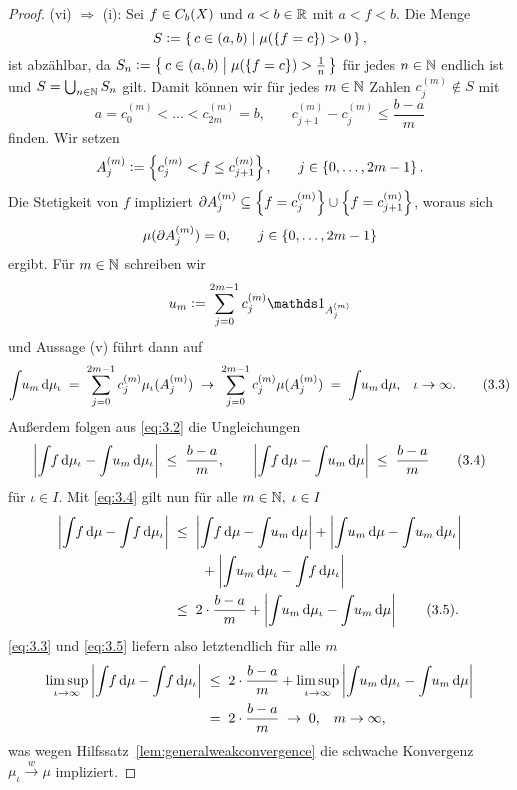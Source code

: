 \documentclass[../main/main.tex]{subfiles}
\begin{document}
\begin{proof}
		(vi) $\Rightarrow$ (i): Sei $f \in C_b(X)$ und $a < b \in \mathbb{R}$ 
		mit $a < f < b$. Die Menge
		$$S \vcentcolon = \left\{\, c \in (a, b) \; \middle| \; \mu(\left\{f = c\right\}) > 0 \,\right\} \text{,}$$
		ist abzählbar, da 
		$S_n \vcentcolon = \left\{\, c \in (a, b) \; \middle| \; \mu(\left\{f = c\right\}) > \frac{1}{n} \,\right\}$ 
		für jedes $n \in \mathbb{N}$ endlich ist und $S = \bigcup_{n \in \mathbb{N}} S_n$ gilt.
		Damit können wir für jedes $m \in \mathbb{N}$ Zahlen $c_j^{(m)} \notin S$ mit
		\[a = c_0^{(m)} < \dots < c_{2m}^{(m)} = 
		b \text{,} \qquad c_{j+1}^{(m)} - c_j^{(m)} \leq \frac{b-a}{m} 
		\label{eq:3.2} \tag{3.2}\]
		finden. Wir setzen
		$$A_j^{(m)} \vcentcolon = \left\{c_j^{(m)} < f \leq c_{j+1}^{(m)}\right\}\text{,}
		\qquad j \in \left\{0,\dots,2m-1\right\} \text{.}$$ 
		Die Stetigkeit von $f$ impliziert 
		$\partial A_j^{(m)} \subseteq \left\{f = c_j^{(m)}\right\} \cup \left\{f = c_{j+1}^{(m)}\right\}$, 
		woraus sich 
		$$\mu(\partial A_j^{(m)}) = 0 \text{,} \qquad j \in \left\{0,\dots,2m-1\right\}$$
		ergibt. Für $m \in \mathbb{N}$ schreiben wir
		$$u_m \defby \sum_{j=0}^{2m-1} c_j^{(m)} \indfct_{A_j^{(m)}}$$
		und Aussage (v) führt dann auf
		\[\int_{} \, u_m \, \mathrm{d}\mu_\iota \; = \; \sum_{j=0}^{2m-1} c_j^{(m)} \mu_\iota(A_j^{(m)}) 
		\; \to \; \sum_{j=0}^{2m-1} c_j^{(m)} \mu(A_j^{(m)}) \; = \; 
		\int_{} \, u_m \, \mathrm{d}\mu \text{,} \quad \iota \to \infty \text{.} 
		\label{eq:3.3} \tag{3.3}\]
		Außerdem folgen aus \eqref{eq:3.2} die Ungleichungen
		\[\left| \int_{} \, f \, \mathrm{d}\mu_\iota - \int_{} \, u_m \, \mathrm{d}\mu_\iota \right| \; \leq \; 
		\frac{b-a}{m} \text{,} \qquad 
		\left| \int_{} \, f \, \mathrm{d}\mu - \int_{} \, u_m \, \mathrm{d}\mu \right| \; \leq \; 
		\frac{b-a}{m} \label{eq:3.4} \tag{3.4}\]
		für $\iota \in I$.
		Mit \eqref{eq:3.4} gilt nun für alle $m \in \mathbb{N}, \; \iota \in I$
		\begin{align*}
			\left| \int_{} \, f \, \mathrm{d}\mu - \int_{} \, f \, \mathrm{d}\mu_\iota \right| \; &\leq \; 
			\left| \int_{} \, f \, \mathrm{d}\mu - \int_{} \, u_m \, \mathrm{d}\mu \right| + 
			\left| \int_{} \, u_m \, \mathrm{d}\mu - \int_{} \, u_m \, \mathrm{d}\mu_\iota \right| \\ & \qquad + 
			\left| \int_{} \, u_m \, \mathrm{d}\mu_\iota - \int_{} \, f \, \mathrm{d}\mu_\iota \right| \\
			&\leq \; 2 \cdot \frac{b-a}{m} + \left| \int_{} \, u_m \, \mathrm{d}\mu_\iota - 
			\int_{} \, u_m \, \mathrm{d}\mu \right| \label{eq:3.5} \tag{3.5}\text{.}
		\end{align*}
		\eqref{eq:3.3} und \eqref{eq:3.5} liefern also letztendlich für alle $m$
		\begin{align*}
			\limsup_{\iota \to \infty} \left| \int_{} \, f \, \mathrm{d}\mu - 
			\int_{} \, f \, \mathrm{d}\mu_\iota \right|
			\; &\leq \; 2 \cdot \frac{b-a}{m} + 
			\limsup_{\iota \to \infty} \left| \int_{} \, u_m \, \mathrm{d}\mu_\iota - 
			\int_{} \, u_m \, \mathrm{d}\mu \right| \\
			&= \; 2 \cdot \frac{b-a}{m} \; \to \; 0 \text{,} 
			\quad m \to \infty \text{,}
		\end{align*}
		was wegen Hilfssatz~\ref{lem:generalweakconvergence} die schwache Konvergenz $\mu_\iota \xrightarrow{w} \mu$ impliziert.
	\end{proof}
\end{document}
